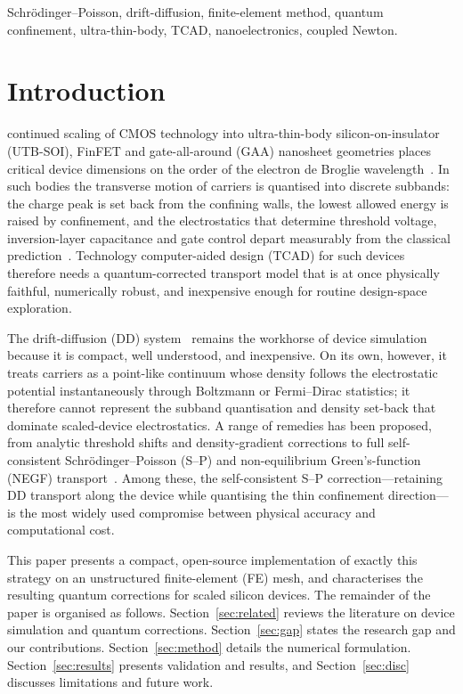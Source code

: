 \documentclass[conference]{IEEEtran}
\begin{document}
\begin{IEEEkeywords}
Schr\"odinger--Poisson, drift-diffusion, finite-element method, quantum
confinement, ultra-thin-body, TCAD, nanoelectronics, coupled Newton.
\end{IEEEkeywords}

\section{Introduction}
 continued scaling of CMOS technology into ultra-thin-body
silicon-on-insulator (UTB-SOI), FinFET and gate-all-around (GAA) nanosheet
geometries places critical device dimensions on the order of the electron de
Broglie wavelength~\cite{colinge,irds}. In such bodies the transverse motion of
carriers is quantised into discrete subbands: the charge peak is set back from
the confining walls, the lowest allowed energy is raised by confinement, and the
electrostatics that determine threshold voltage, inversion-layer capacitance and
gate control depart measurably from the classical
prediction~\cite{ando1982,sternhoward,stern1972}. Technology computer-aided design
(TCAD) for such devices therefore needs a quantum-corrected transport model that
is at once physically faithful, numerically robust, and inexpensive enough for
routine design-space exploration.

The drift-diffusion (DD) system~\cite{selberherr,vanroosbroeck} remains the
workhorse of device simulation because it is compact, well understood, and
inexpensive. On its own, however, it treats carriers as a point-like continuum
whose density follows the electrostatic potential instantaneously through
Boltzmann or Fermi--Dirac statistics; it therefore cannot represent the subband
quantisation and density set-back that dominate scaled-device electrostatics. A
range of remedies has been proposed, from analytic threshold shifts and
density-gradient corrections to full self-consistent Schr\"odinger--Poisson (S--P)
and non-equilibrium Green's-function (NEGF) transport~\cite{vandort,ancona,
trellakis,datta}. Among these, the self-consistent S--P correction---retaining DD
transport along the device while quantising the thin confinement direction---is
the most widely used compromise between physical accuracy and computational cost.

This paper presents a compact, open-source implementation of exactly this strategy
on an unstructured finite-element (FE) mesh, and characterises the resulting
quantum corrections for scaled silicon devices. The remainder of the paper is
organised as follows. Section~\ref{sec:related} reviews the literature on device
simulation and quantum corrections. Section~\ref{sec:gap} states the research gap
and our contributions. Section~\ref{sec:method} details the numerical formulation.
Section~\ref{sec:results} presents validation and results, and
Section~\ref{sec:disc} discusses limitations and future work.
\end{document}
